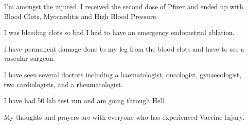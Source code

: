 I’m amongst the injured. I received the second dose of Pfizer and ended up with
Blood Clots, Myocarditis and High Blood Pressure.

I was bleeding clots so bad I had to have an emergency endometrial ablation.

I have permanent damage done to my leg from the blood clots and have to see a
vascular surgeon.

I have seen several doctors including a haematologist, oncologist,
gynaecologist, two cardiologists, and a rheumatologist.

I have had 50 lab test run and am going through Hell.

My thoughts and prayers are with everyone who has experienced Vaccine Injury.

